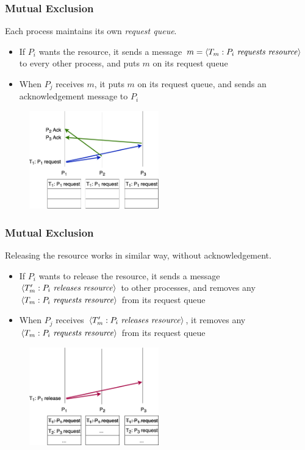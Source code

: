 \documentclass{beamer}
\begin{document}
\frame
{
  \frametitle{Mutual Exclusion}

  Each process maintains its own \emph{request queue}.

  \begin{itemize}
  	\item<3-> If $P_i$ wants the resource, it sends a message $m=\langle T_m:P_i\text{ \emph{requests resource}}\rangle$ to every other process, and puts $m$ on its request queue
  	\item<4-> When $P_j$ receives $m$, it puts $m$ on its request queue, and sends an acknowledgement message to $P_i$
  \end{itemize}
  \begin{figure}[ht!]
  \includegraphics[width=0.5\textwidth]{files/ClockDist-Request.png}
  \end{figure}

}

\frame
{
  \frametitle{Mutual Exclusion}

  Releasing the resource works in similar way, without acknowledgement.

  \begin{itemize}
  	\item<2-> If $P_i$ wants to release the resource, it sends a message $\langle T_m':P_i\text{ \emph{releases resource}}\rangle$ to other processes, and removes any $\langle T_m:P_i\text{ \emph{requests resource}}\rangle$ from its request queue
  	\item<3-> When $P_j$ receives $\langle T_m':P_i\text{ \emph{releases resource}}\rangle$, it removes any $\langle T_m:P_i\text{ \emph{requests resource}}\rangle$ from its request queue
  \end{itemize}
  \begin{figure}[ht!]
  \includegraphics[width=0.5\textwidth]{files/ClockDist-Release.png}
  \end{figure}
}
\end{document}
